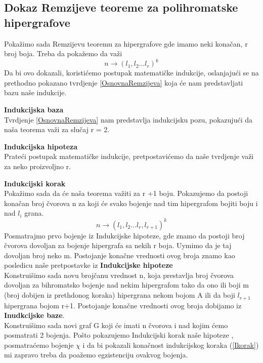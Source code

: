 \documentclass[a4paper]{article}
\begin{document}
	\subsection{Dokaz Remzijeve teoreme za polihromatske hipergrafove}
	Pokažimo sada Remzijevu teoremu za hipergrafove gde imamo neki konačan, r broj boja. Treba da pokažemo da važi 
	\begin{equation}
		n \rightarrow (l_1, l_2 \dots l_r)^k
	\end{equation}
	Da bi ovo dokazali, koristićemo postupak matematičke indukcije, oslanjajući se na prethodno pokazano tvrdjenje \ref{OsnovnaRemzijeva} koja će nam predstavljati bazu naše indukcije.
	\begin{description}
		\item \textbf{Indukcijska baza} \\
		Tvrdjenje \ref{OsnovnaRemzijeva} nam predstavlja indukcijsku pozu, pokazujući da naša teorema važi za slučaj r = 2.\\
		\item \textbf{Indukcijska hipoteza}\\
		Prateći postupak matematičke indukcije, pretpostavićemo da naše tvrdjenje važi za neko proizvoljno r.\\
		\item \textbf{Indukcijski korak}\\
		Pokažimo sada da će naša teorema važiti za r +1 boju.
		Pokazujemo da postoji konačan broj čvorova n za koji će svako bojenje nad tim hipergrafom bojiti boju i nad $l_i$ grana. %
		\begin{equation}\label{Ikorak}
		 n \rightarrow (l_1, l_2 \dots l_r, l_{r+1})^k
		\end{equation}
		Posmatrajmo prvo bojenje iz Indukcijske hipoteze, gde znamo da postoji broj čvorova dovoljan za bojenje hipergrafa sa nekih r boja. Uymimo da je taj dovoljan broj neko m. Postojanje konačne vrednosti ovog broja znamo kao posledicu naše pretpostavke iz \textbf{Indukcijske hipoteze}\\
		Konstruišimo sada novu brojčanu vrednost n, koja prestavlja broj čvorova dovoljan za bihromatsko bojenje  nad nekim hipergrafom tako da ono ili boji m (broj dobijen iz prethdonog koraka) hipergrana nekom bojom A ili da boji $l_{r+1}$ hipergrana bojom r+1. Postojanje konačne vrednosti ovog broja dobijamo iz \textbf{Inudkcijske baze}. 
		\\
		Konstruišimo sada novi graf G koji će imati n čvorova i nad kojim ćemo posmatrati 2 bojenja. Pošto pokazujemo Indukcijski korak naše hipoteze , posmatraćemo bojenje $\chi$ i da bi pokazali konačnost indukcijskog koraka (\ref{Ikorak}) mi zapravo treba da poažemo egzistenciju ovakvog bojenja.

\end{description}
\end{document}
